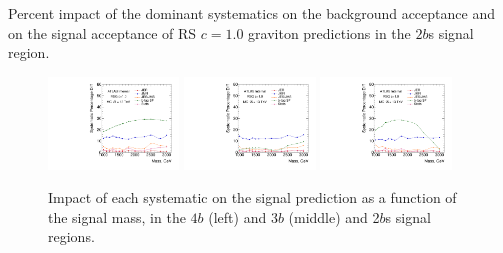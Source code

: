 
\begin{table}[htbp!]
\scriptsize
\begin{center}

\caption{Percent impact of the dominant systematics on the  background acceptance
         and on the signal acceptance of RS $c=1.0$ graviton predictions in the $2b$s signal region.}
\label{tab:summary-systematics-2b}
\end{center}
\end{table}

\begin{figure}[htbp!]
\begin{center}
\includegraphics[angle=270, width=0.31\textwidth]{figures/boosted/Syst_MC/FourTag_RSG_syst.pdf}
\includegraphics[angle=270, width=0.31\textwidth]{figures/boosted/Syst_MC/ThreeTag_RSG_syst.pdf}
\includegraphics[angle=270, width=0.31\textwidth]{figures/boosted/Syst_MC/TwoTag_split_RSG_syst.pdf}
\caption{Impact of each systematic on the signal prediction as a function of the signal mass, in the $4b$ (left) and $3b$ (middle) and 2$b$s signal regions.}
\label{fig:signal_syst_summary}
\end{center}
\end{figure}

